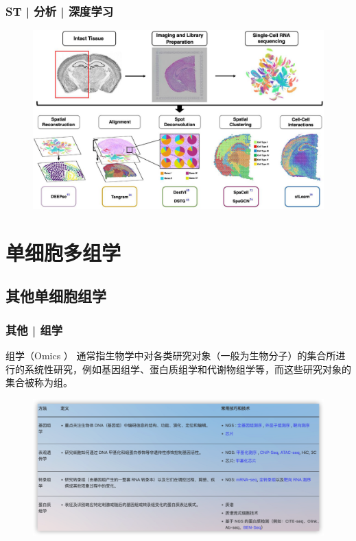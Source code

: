 \documentclass[11pt]{ctexbeamer}
\begin{document}
\begin{frame}
	\frametitle{ST | 分析 | 深度学习}
	\begin{figure}
		\includegraphics[width=\textwidth]{ST_deeplearning_01.png}
	\end{figure}
\end{frame}


\section{单细胞多组学}
\subsection{其他单细胞组学}
\begin{frame}
	\frametitle{其他 | 组学}
	\begin{block}{组学（Omics ）}	
		通常指生物学中对各类研究对象（一般为生物分子）的集合所进行的系统性研究，例如基因组学、蛋白质组学和代谢物组学等，而这些研究对象的集合被称为组。
	\end{block}
	\begin{figure}
	\includegraphics[width=\textwidth]{omics_08.png}
\end{figure}
\end{frame}
\end{document}
